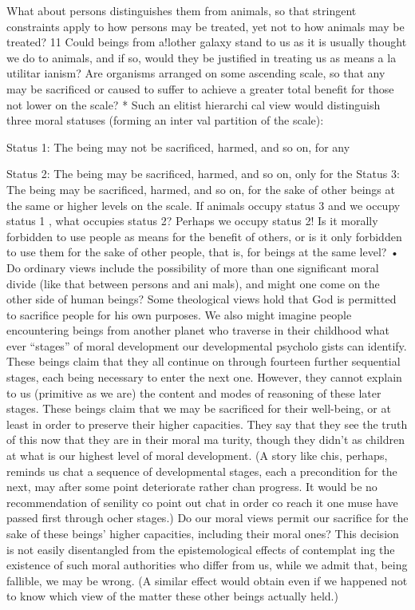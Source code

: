 \documentclass[11pt,openany]{book}
\begin{document}
What about persons distinguishes them from animals, so that stringent constraints apply to how persons may be treated, yet not to how animals may be treated? 11 Could beings from a!lother galaxy stand to us as it is usually thought we do to animals, and if so, would they be justified in treating us as means a la utilitar ianism? Are organisms arranged on some ascending scale, so that any may be sacrificed or caused to suffer to achieve a greater total benefit for those not lower on the scale? * Such an elitist hierarchi cal view would distinguish three moral statuses (forming an inter val partition of the scale): 

Status 1: The being may not be sacrificed, harmed, and so on, for any 

Status 2: The being may be sacrificed, harmed, and so on, only for the Status 3: The being may be sacrificed, harmed, and so on, for the sake of other beings at the same or higher levels on the scale. If animals occupy status 3 and we occupy status 1 , what occupies status 2? Perhaps we occupy status 2! Is it morally forbidden to use people as means for the benefit of others, or is it only forbidden to use them for the sake of other people, that is, for beings at the same level? • Do ordinary views include the possibility of more than one significant moral divide (like that between persons and ani mals), and might one come on the other side of human beings? Some theological views hold that God is permitted to sacrifice people for his own purposes. We also might imagine people encountering beings from another planet who traverse in their childhood what ever ``stages'' of moral development our developmental psycholo gists can identify. These beings claim that they all continue on through fourteen further sequential stages, each being necessary to enter the next one. However, they cannot explain to us (primitive as we are) the content and modes of reasoning of these later stages. These beings claim that we may be sacrificed for their well-being, or at least in order to preserve their higher capacities. They say that they see the truth of this now that they are in their moral ma turity, though they didn't as children at what is our highest level of moral development. (A story like chis, perhaps, reminds us chat a sequence of developmental stages, each a precondition for the next, may after some point deteriorate rather chan progress. It would be no recommendation of senility co point out chat in order co reach it one muse have passed first through ocher stages.) Do our moral views permit our sacrifice for the sake of these beings' higher capacities, including their moral ones? This decision is not easily disentangled from the epistemological effects of contemplat ing the existence of such moral authorities who differ from us, while we admit that, being fallible, we may be wrong. (A similar effect would obtain even if we happened not to know which view of the matter these other beings actually held.) 
\end{document}
